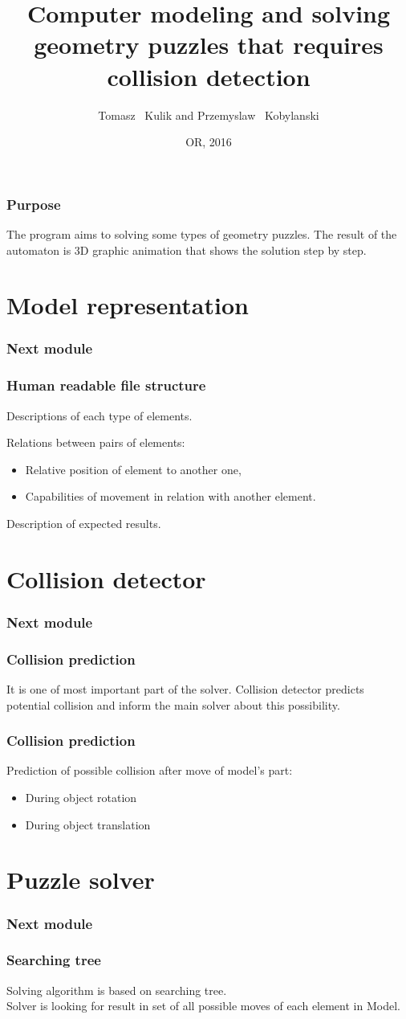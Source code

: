 \documentclass{beamer}
\title[]
{Computer modeling and solving geometry puzzles that requires collision detection}
\author[Kulik, Kobylanski]
{
    Tomasz ~Kulik and
    Przemyslaw ~Kobylanski
}
\institute[Wroclaw University of Science and Technology]
{
  Institute of Mathematics and Computer Science\\
  Wrocław University of Science and Technology\\
  POLAND
}
\date[OR 2016]
{OR, 2016}
\begin{document}
    \frame
    {
        \titlepage
    }
    \frame
    {
        \frametitle{Purpose}
        The program aims to solving some types of geometry puzzles. The result of the automaton is
        3D graphic animation that shows the solution step by step.
    }

    \section{Model representation}
    \frame
    {
        \frametitle{Next module}
        \tableofcontents[currentsection]
    }

    \frame
    {
        \frametitle{Human readable file structure}
        \itemize
        {
            \item Descriptions of each type of elements.
            \item Relations between pairs of elements:
                \begin{itemize}
                    \item Relative position of element to another one,
                    \item Capabilities of movement in relation with another element.
                \end{itemize}
            \item Description of expected results.
        }
    }

    \section{Collision detector}
    \frame
    {
        \frametitle{Next module}
        \tableofcontents[currentsection]
    }

    \frame
    {
        \frametitle{Collision prediction}
        It is one of most important part of the solver. Collision detector
        predicts potential collision and inform the main solver about this possibility.
    }

    \frame
    {
        \frametitle{Collision prediction}
        Prediction of possible collision after move of model's part:
        \begin{itemize}
            \item During object rotation
            \item During object translation
        \end{itemize}
    }

    \section{Puzzle solver}
    \frame
    {
        \frametitle{Next module}
        \tableofcontents[currentsection]
    }
    \frame
    {
        \frametitle{Searching tree}
        Solving algorithm is based on searching tree.\\
        Solver is looking for result in set of all possible moves of each element in Model.
    }
\end{document}

